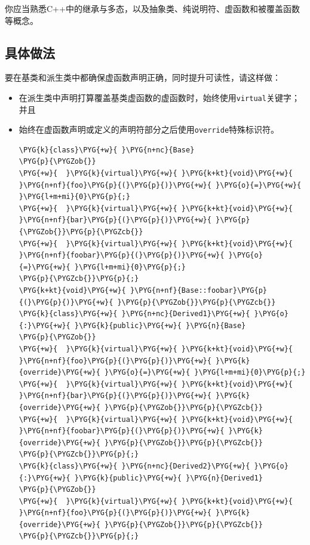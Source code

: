 
你应当熟悉C++中的继承与多态，以及抽象类、纯说明符、虚函数和被覆盖函数等概念。



\subsection{具体做法}



要在基类和派生类中都确保虚函数声明正确，同时提升可读性，请这样做：



\begin{itemize}
\item 在派生类中声明打算覆盖基类虚函数的虚函数时，始终使用\texttt{virtual}关键字；并且



\item 始终在虚函数声明或定义的声明符部分之后使用\texttt{override}特殊标识符。



\begin{codeblockbg}
\begin{Verbatim}[commandchars=\\\{\},breaklines=true,breakanywhere=true,fontsize=\codefont,xleftmargin=17bp]
\PYG{k}{class}\PYG{+w}{ }\PYG{n+nc}{Base}
\PYG{p}{\PYGZob{}}
\PYG{+w}{  }\PYG{k}{virtual}\PYG{+w}{ }\PYG{k+kt}{void}\PYG{+w}{ }\PYG{n+nf}{foo}\PYG{p}{(}\PYG{p}{)}\PYG{+w}{ }\PYG{o}{=}\PYG{+w}{ }\PYG{l+m+mi}{0}\PYG{p}{;}
\PYG{+w}{  }\PYG{k}{virtual}\PYG{+w}{ }\PYG{k+kt}{void}\PYG{+w}{ }\PYG{n+nf}{bar}\PYG{p}{(}\PYG{p}{)}\PYG{+w}{ }\PYG{p}{\PYGZob{}}\PYG{p}{\PYGZcb{}}
\PYG{+w}{  }\PYG{k}{virtual}\PYG{+w}{ }\PYG{k+kt}{void}\PYG{+w}{ }\PYG{n+nf}{foobar}\PYG{p}{(}\PYG{p}{)}\PYG{+w}{ }\PYG{o}{=}\PYG{+w}{ }\PYG{l+m+mi}{0}\PYG{p}{;}
\PYG{p}{\PYGZcb{}}\PYG{p}{;}
\PYG{k+kt}{void}\PYG{+w}{ }\PYG{n+nf}{Base::foobar}\PYG{p}{(}\PYG{p}{)}\PYG{+w}{ }\PYG{p}{\PYGZob{}}\PYG{p}{\PYGZcb{}}
\PYG{k}{class}\PYG{+w}{ }\PYG{n+nc}{Derived1}\PYG{+w}{ }\PYG{o}{:}\PYG{+w}{ }\PYG{k}{public}\PYG{+w}{ }\PYG{n}{Base}
\PYG{p}{\PYGZob{}}
\PYG{+w}{  }\PYG{k}{virtual}\PYG{+w}{ }\PYG{k+kt}{void}\PYG{+w}{ }\PYG{n+nf}{foo}\PYG{p}{(}\PYG{p}{)}\PYG{+w}{ }\PYG{k}{override}\PYG{+w}{ }\PYG{o}{=}\PYG{+w}{ }\PYG{l+m+mi}{0}\PYG{p}{;}
\PYG{+w}{  }\PYG{k}{virtual}\PYG{+w}{ }\PYG{k+kt}{void}\PYG{+w}{ }\PYG{n+nf}{bar}\PYG{p}{(}\PYG{p}{)}\PYG{+w}{ }\PYG{k}{override}\PYG{+w}{ }\PYG{p}{\PYGZob{}}\PYG{p}{\PYGZcb{}}
\PYG{+w}{  }\PYG{k}{virtual}\PYG{+w}{ }\PYG{k+kt}{void}\PYG{+w}{ }\PYG{n+nf}{foobar}\PYG{p}{(}\PYG{p}{)}\PYG{+w}{ }\PYG{k}{override}\PYG{+w}{ }\PYG{p}{\PYGZob{}}\PYG{p}{\PYGZcb{}}
\PYG{p}{\PYGZcb{}}\PYG{p}{;}
\PYG{k}{class}\PYG{+w}{ }\PYG{n+nc}{Derived2}\PYG{+w}{ }\PYG{o}{:}\PYG{+w}{ }\PYG{k}{public}\PYG{+w}{ }\PYG{n}{Derived1}
\PYG{p}{\PYGZob{}}
\PYG{+w}{  }\PYG{k}{virtual}\PYG{+w}{ }\PYG{k+kt}{void}\PYG{+w}{ }\PYG{n+nf}{foo}\PYG{p}{(}\PYG{p}{)}\PYG{+w}{ }\PYG{k}{override}\PYG{+w}{ }\PYG{p}{\PYGZob{}}\PYG{p}{\PYGZcb{}}
\PYG{p}{\PYGZcb{}}\PYG{p}{;}
\end{Verbatim}
\end{codeblockbg}

\end{itemize}


